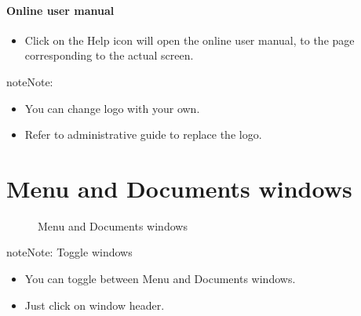 \documentclass[letterpaper,10pt,english]{sphinxmanual}
\begin{document}
\paragraph{Online user manual}
\begin{itemize}
\item {} 
Click on the Help icon  will open the online user manual, to the page corresponding to the actual screen.

\end{itemize}

\begin{notice}{note}{Note:}\begin{itemize}
\item {} 
You can change logo with your own.

\item {} 
Refer to administrative guide to replace the logo.

\end{itemize}
\end{notice}
\newpage

\section{Menu and Documents windows}
\label{Gui:menu-and-documents-windows}\begin{figure}[htbp]
\centering
\capstart

\caption{Menu and Documents windows}\end{figure}

\begin{notice}{note}{Note:}
Toggle windows
\begin{itemize}
\item {} 
You can toggle between Menu and Documents windows.

\item {} 
Just click on window header.

\end{itemize}
\end{notice}
\end{document}
